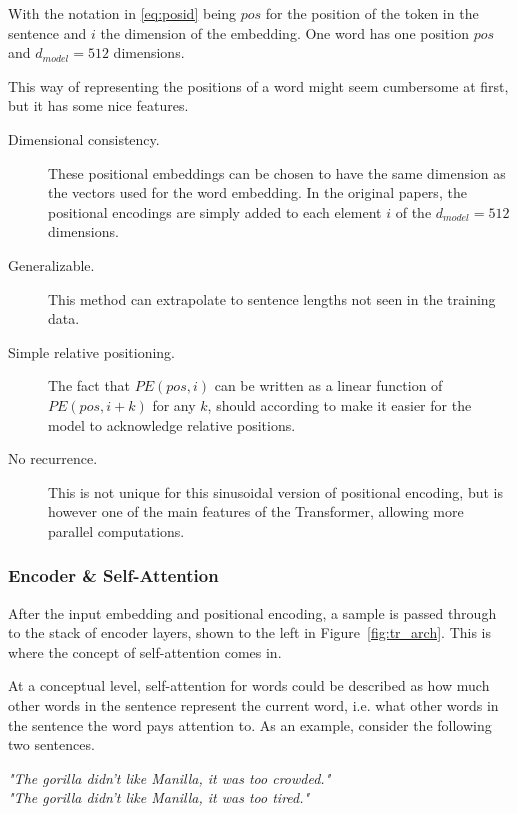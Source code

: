 With the notation in \ref{eq:posid} being $pos$ for the position of the token in the sentence and $i$ the dimension of the embedding. One word has one position $pos$ and $d_{model} = 512$ dimensions.

This way of representing the positions of a word might seem cumbersome at first, but it has some nice features. 

\begin{description}
    \item[Dimensional consistency.] These positional embeddings can be chosen to have the same dimension as the vectors used for the word embedding. In the original papers, the positional encodings are simply added to each element $i$ of the $d_{model} = 512$ dimensions. 
    \item[Generalizable.] This method can extrapolate to sentence lengths not seen in the training data. 
    \item[Simple relative positioning.] The fact that $PE(pos, i)$ can be written as a linear function of $PE(pos, i + k)$ for any $k$, should according to \citet{NIPS2017_7181} make it easier for the model to acknowledge relative positions. 
    \item[No recurrence.] This is not unique for this sinusoidal version of positional encoding, but is however one of the main features of the Transformer, allowing more parallel computations. 
\end{description}

\subsubsection{Encoder \& Self-Attention}

After the input embedding and positional encoding, a sample is passed through to the stack of encoder layers, shown to the left in Figure~\ref{fig:tr_arch}. This is where the concept of self-attention comes in. 

At a conceptual level, self-attention for words could be described as how much other words in the sentence represent the current word, i.e. what other words in the sentence the word pays attention to. As an example, consider the following two sentences. 

\begin{center}
    \textit{"The gorilla didn't like Manilla, it was too crowded."} \\ \vspace{1em}
    \textit{"The gorilla didn't like Manilla, it was too tired."}
\end{center}

